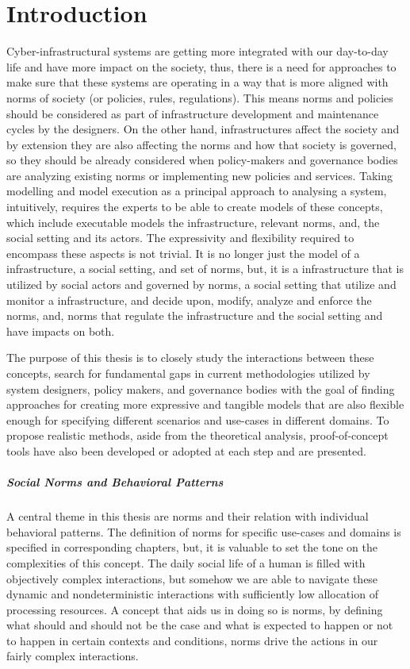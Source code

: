 \chapter{Introduction}
Cyber-infrastructural systems are getting more integrated with our day-to-day life and have more impact on the society, thus, there is a need for approaches to make sure that these systems are operating in a way that is more aligned with norms of society (or policies, rules, regulations). This means norms and policies should be considered as part of infrastructure development and maintenance cycles by the designers. On the other hand, infrastructures affect the society and by extension they are also affecting the norms and how that society is governed, so they should be already considered when policy-makers and governance bodies are analyzing existing norms or implementing new policies and services. Taking modelling and model execution as a principal approach to analysing a system, intuitively, requires the experts to be able to create models of these concepts, which include executable models the infrastructure, relevant norms, and, the social setting and its actors. The expressivity and flexibility required to encompass these aspects is not trivial. It is no longer just the model of a infrastructure, a social setting, and set of norms, but, it is a infrastructure that is utilized by social actors and governed by norms, a social setting that utilize and monitor a infrastructure, and decide upon, modify, analyze and enforce the norms, and, norms that regulate the infrastructure and the social setting and have impacts on both.


The purpose of this thesis is to closely study the interactions between these concepts, search for fundamental gaps in current methodologies utilized by system designers, policy makers, and governance bodies with the goal of finding approaches for creating more expressive and tangible models that are also flexible enough for specifying different scenarios and use-cases in different domains. To propose realistic methods, aside from the theoretical analysis, proof-of-concept tools have also been developed or adopted at each step and are presented.


\paragraph{Social Norms and Behavioral Patterns}
A central theme in this thesis are norms and their relation with individual behavioral patterns. The definition of norms for specific use-cases and domains is specified in corresponding chapters, but, it is valuable to set the tone on the complexities of this concept. The daily social life of a human is filled with objectively complex interactions, but somehow we are able to navigate these dynamic and nondeterministic interactions with sufficiently low allocation of processing resources. A concept that aids us in doing so is norms, by defining what should and should not be the case and what is expected to happen or not to happen in certain contexts and conditions, norms drive the actions in our fairly complex interactions. 


